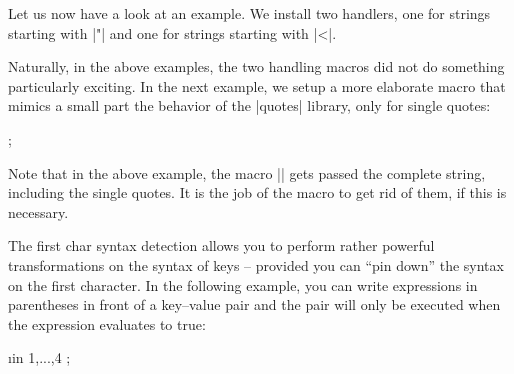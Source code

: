 Let us now have a look at an example. We install two handlers, one for strings
starting with |"| and one for strings starting with |<|.
%
\begin{codeexample}[pre={\begin{lateximage}},post={\end{lateximage}}]

\def\myquotemacro#1{Quoted: #1. }
\def\mypointedmacro#1{Pointed: #1. }

\ttfamily {}
\end{codeexample}

Naturally, in the above examples, the two handling macros did not do something
particularly exciting. In the next example, we setup a more elaborate macro
that mimics a small part the behavior of the |quotes| library, only for single
quotes:
%
\begin{codeexample}[]

\def\mysinglequotemacro#1{\pgfkeysalso{label={#1}}}

\tikz {};
\end{codeexample}

Note that in the above example, the macro |\mysinglequotemacro| gets passed the
complete string, including the single quotes. It is the job of the macro to get
rid of them, if this is necessary.

The first char syntax detection allows you to perform rather powerful
transformations on the syntax of keys -- provided you can ``pin down'' the
syntax on the first character. In the following example, you can write
expressions in parentheses in front of a key--value pair and the pair will only
be executed when the expression evaluates to true:
%
\begin{codeexample}[]

\def\myparamacro#1{\myparaparser#1\someendtext}
\def\myparaparser(#1)#2\someendtext{
  \ifx\pgfmathresult\onetext
  \fi
}
\def\onetext{1}

\foreach \i in {1,...,4}
  \tikz {};
\end{codeexample}


